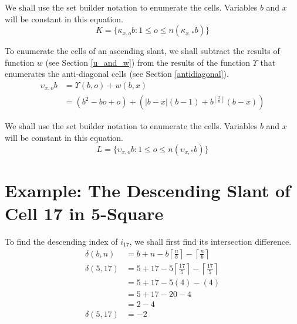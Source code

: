 \documentclass[letterpaper, twoside,12pt]{book}
\begin{document}
    We shall use the set builder notation to enumerate the cells. Variables $b$ and $x$ will be constant in this equation.
    \begin{equation}
        K = \{ \kappa_{x,o}b : 1 \leq o \leq n(\kappa_{x,*}b) \}
    \end{equation}

    To enumerate the cells of an ascending slant, we shall subtract the results of function $w$ (see Section \ref{u_and_w}) from the results of the function $\Upsilon$ that enumerates the anti-diagonal cells (see Section \ref{antidiagonal}).
    \begin{equation}
        \begin{split}
            \upsilon_{x,o}b &= \Upsilon(b,o) + w(b,x) \\
                &= (b^2 - bo + o) + (|b-x|(b-1)+ b^{\left\lfloor \frac{x}{b} \right\rfloor}(b-x))
        \end{split}
    \end{equation}

    We shall use the set builder notation to enumerate the cells. Variables $b$ and $x$ will be constant in this equation.
    \begin{equation}
        L = \{ \upsilon_{x,o}b : 1 \leq o \leq n(\upsilon_{x,*}b) \}
    \end{equation}

    \section{Example: The Descending Slant of Cell 17 in 5-Square} \label{3-4_example_1}
    To find the descending index of $i_{17}$, we shall first find its intersection difference.
    \begin{equation*}
        \begin{split}
            \delta(b,n) &= b + n - b\left\lceil \frac{n}{b} \right\rceil - \left\lceil \frac{n}{b} \right\rceil\\
            \delta(5,17) &= 5 + 17 - 5\left\lceil \frac{17}{5} \right\rceil - \left\lceil \frac{17}{5} \right\rceil\\
                &= 5 + 17 - 5(4) - (4)\\
                &= 5 + 17 - 20 - 4\\
                &= 2 - 4\\
            \delta(5,17) &= -2\\
        \end{split}
    \end{equation*}
\end{document}
